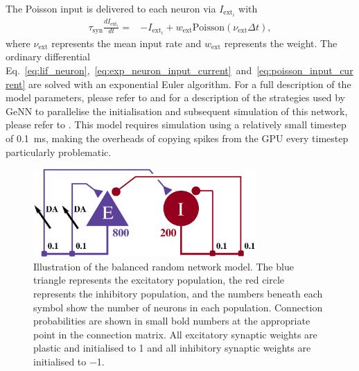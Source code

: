 \documentclass[utf8]{frontiersSCNS} %
\begin{document}
The Poisson input is delivered to each neuron via $I_{\text{ext}_{i}}$ with
%
\begin{align}
    \tau_{\text{syn}} \frac{dI_{\text{ext}_{i}}}{dt} = & -I_{\text{ext}_{i}} + w_{\text{ext}} \text{Poisson}(\nu_{\text{ext}} \Delta t),\label{eq:poisson_input_current}
\end{align}
%
where $\nu_{\text{ext}}$ represents the mean input rate and $w_{\text{ext}}$ represents the weight.
The ordinary differential Eq.~\ref{eq:lif_neuron},~\ref{eq:exp_neuron_input_current}~and~\ref{eq:poisson_input_current} are solved with an exponential Euler algorithm.
For a full description of the model parameters, please refer to \citet[tables 4 and 5]{Potjans2012} and for a description of the strategies used by GeNN to parallelise the initialisation and subsequent simulation of this network, please refer to \citet[section 2.3]{Knight2018}.
This model requires simulation using a relatively small timestep of \SI{0.1}{\milli\second}, making the overheads of copying spikes from the GPU every timestep particularly problematic.
%
\begin{figure}[t!]
    \begin{center}
        \includegraphics[width=85mm]{figures/circuit2}
    \end{center}
    \caption{Illustration of the balanced random network model.
    The blue triangle represents the excitatory population, the red circle represents the inhibitory population, and the numbers beneath each symbol show the number of neurons in each population.
    Connection probabilities are shown in small bold numbers at the appropriate point in the connection matrix.
    All excitatory synaptic weights are plastic and initialised to \num{1} and all inhibitory synaptic weights are initialised to \num{-1}.}
    \label{fig:pavlovian_circuit}
\end{figure}
%
\end{document}
